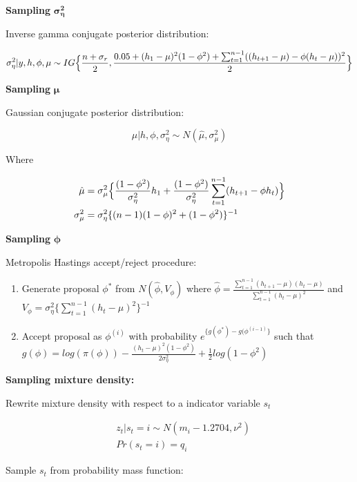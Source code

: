 \documentclass[
  12pt,
  letterpaper,
  DIV=11,
  numbers=noendperiod]{scrartcl}
\begin{document}
\textbf{Sampling} \(\boldsymbol{\sigma_{\eta}^2}\)

Inverse gamma conjugate posterior distribution:

\[
\sigma^2_{\eta} | y,h,\phi,\mu \sim IG \Bigl\{\frac{n+\sigma_r}{2}, \frac{0.05 + (h_1 - \mu)^2 (1 - \phi^2) + \sum_{t=1}^{n-1}((h_{t+1} - \mu) - \phi(h_t - \mu))^2}{2}\Bigr\}
\]

\textbf{Sampling} \(\boldsymbol{\mu}\)

Gaussian conjugate posterior distribution:

\[
\mu | h,\phi,\sigma^2_{\eta}  \sim N(\hat{\mu}, \sigma^2_{\mu})
\]

Where

\[
\begin{aligned}
\hat{\mu} &= \sigma^2_{\mu} \Bigl\{\frac{(1-\phi^2)}{\sigma_{\eta}^2}h_1 +\frac{(1-\phi^2)}{\sigma_{\eta}^2} \sum_{t=1}^{n-1} (h_{t+1} - \phi h_t)\Bigr\} \\
\sigma^2_{\mu} &= \sigma^2_{\eta} \{(n-1)(1-\phi)^2 + (1-\phi^2)\}^{-1}
\end{aligned}
\]

\textbf{Sampling} \(\boldsymbol{\phi}\)

Metropolis Hastings accept/reject procedure:

\begin{enumerate}
\def\labelenumi{\arabic{enumi})}
\item
  Generate proposal \(\phi^\ast\) from \(N(\hat{\phi}, V_{\phi})\) where
  \(\hat{\phi} = \frac{\sum_{t=1}^{n-1} (h_{t+1} - \mu)(h_t - \mu)}{\sum_{t=1}^{n-1} (h_t - \mu)^2}\)
  and
  \(V_{\phi} = \sigma^2_{\eta} \{\sum_{t=1}^{n-1} (h_t - \mu)^2\}^{-1}\)
\item
  Accept proposal as \(\phi^{(i)}\) with probability
  \(e^{\{g(\phi^\ast) - g(\phi^{(i-1)}\}}\) such that
  \(g(\phi) = log (\pi (\phi)) - \frac {(h_t - \mu)^2 (1-\phi^2)}{2 \sigma_{\eta}^2} + \frac{1}{2} log (1-\phi^2)\)
\end{enumerate}

\textbf{Sampling mixture density:}

Rewrite mixture density with respect to a indicator variable \(s_t\)

\[
\begin{aligned}
&z_t | s_t = i \sim N(m_i - 1.2704, \nu^2) \\
&Pr(s_t = i) = q_i
\end{aligned}
\]

Sample \(s_t\) from probability mass function:
\end{document}
